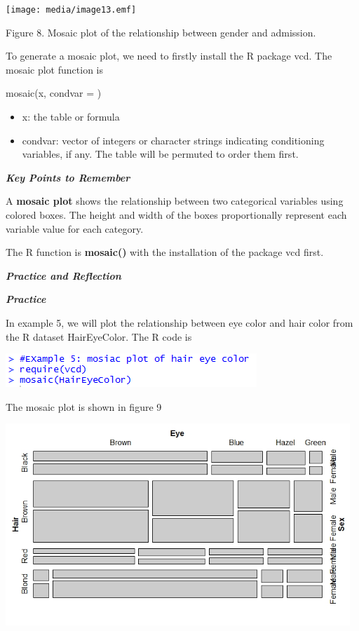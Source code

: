 \texttt{[image: media/image13.emf]}

Figure 8. Mosaic plot of the relationship between gender and admission.

To generate a mosaic plot, we need to firstly install the R package vcd.
The mosaic plot function is

mosaic(x, condvar = )

\begin{itemize}
\item
  x: the table or formula
\item
  condvar: vector of integers or character strings indicating
  conditioning variables, if any. The table will be permuted to order
  them first.
\end{itemize}

\emph{\textbf{Key Points to Remember}}

A \textbf{mosaic plot} shows the relationship between two categorical
variables using colored boxes. The height and width of the boxes
proportionally represent each variable value for each category.

The R function is \textbf{mosaic()} with the installation of the package
vcd first.

\emph{\textbf{Practice and Reflection}}

\emph{\textbf{Practice}}

In example 5, we will plot the relationship between eye color and hair
color from the R dataset HairEyeColor. The R code is

\includegraphics[width=3.72917in,height=0.5in]{media/image14.png}

The mosaic plot is shown in figure 9

\includegraphics[width=5.11475in,height=3in]{media/image15.jpeg}

